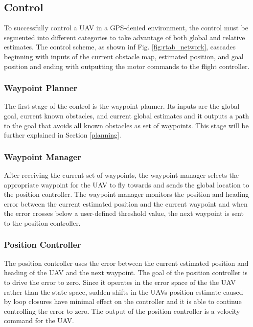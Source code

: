 \documentclass[letterpaper, 10 pt, conference]{ieeeconf}  %
\begin{document}
\subsection{Control}

To successfully control a UAV in a GPS-denied environment, the control must be segmented into different categories to take advantage of both global and relative estimates. The control scheme, as shown inf Fig. \ref{fig:rtab_network}, cascades beginning with inputs of the current obstacle map, estimated position, and goal position and ending with outputting the motor commands to the flight controller.

\subsubsection{Waypoint Planner}

The first stage of the control is the waypoint planner. Its inputs are the global goal, current known obstacles, and current global estimates and it outputs a path to the goal that avoids all known obstacles as set of waypoints. This stage will be further explained in Section \ref{planning}.

\subsubsection{Waypoint Manager}

After receiving the current set of waypoints, the waypoint manager selects the appropriate waypoint for the UAV to fly towards and sends the global location to the position controller. The waypoint manager monitors the position and heading error between the current estimated position and the current waypoint and when the error crosses below a user-defined threshold value, the next waypoint is sent to the position controller.

\subsubsection{Position Controller}

The position controller uses the error between the current estimated position and heading of the UAV and the next waypoint. The goal of the position controller is to drive the error to zero. Since it operates in the error space of the the UAV rather than the state space, sudden shifts in the UAVs position estimate caused by loop closures have minimal effect on the controller and it is able to continue controlling the error to zero. The output of the position controller is a velocity command for the UAV.
\end{document}
